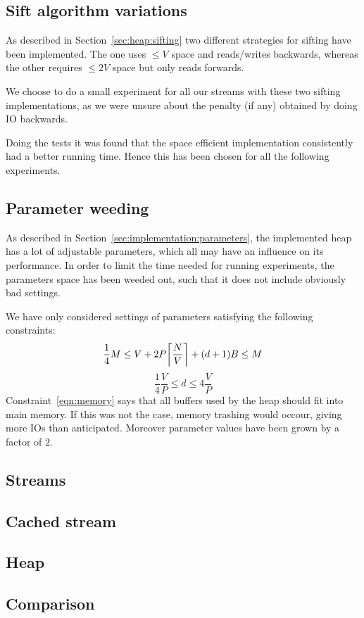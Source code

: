 
\subsection{Sift algorithm variations}
As described in Section~\ref{sec:heap:sifting} two different strategies for sifting have been implemented. The one uses $\leq V$ space and reads/writes backwards, whereas the other requires $\leq 2V$ space but only reads forwards.

We choose to do a small experiment for all our streams with these two sifting implementations, as we were unsure about the penalty (if any) obtained by doing IO backwards.

Doing the tests it was found that the space efficient implementation consistently had a better running time. Hence this has been chosen for all the following experiments.

\subsection{Parameter weeding}
As described in Section~\ref{sec:implementation:parameters}, the implemented heap has a lot of adjustable parameters, which all may have an influence on its performance. In order to limit the time needed for running experiments, the parameters space has been weeded out, such that it does not include obviously bad settings.

We have only considered settings of parameters satisfying the following constraints:
\begin{equation}
  \label{eqn:memory}
  \frac{1}{4}M \leq V + 2P \ceil*{\frac{N}{V}} + (d + 1)B \leq M
\end{equation}
\begin{equation}
  \label{eqn:fanout}
  \frac{1}{4} \frac{V}{P} \leq d \leq 4 \frac{V}{P}
\end{equation}
Constraint~\ref{eqn:memory} says that all buffers used by the heap should fit into main memory. If this was not the case, memory trashing would occour, giving more IOs than anticipated. Moreover parameter values have been grown by a factor of $2$.

\subsection{Streams}


\subsection{Cached stream}

\subsection{Heap}


\subsection{Comparison}
